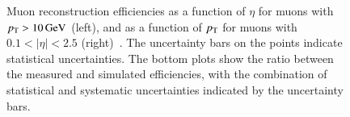 \begin{figure}[htbp]
	\centering
	\hfill
	\caption{Muon reconstruction efficiencies as a function of $\eta$ for muons with $p_{\text{T}}>\SI{10}{\giga\electronvolt}$ (left), and as a function of $p_{\text{T}}$ for muons with $0.1<|\eta|<2.5$ (right)~\cite{TheATLASCollaboration:2014bm}. The uncertainty bars on the points indicate statistical uncertainties. The bottom plots show the ratio between the measured and simulated efficiencies, with the combination of statistical and systematic uncertainties indicated by the uncertainty bars.}
	\label{fig:reco-muon-efficiency}
\end{figure}


